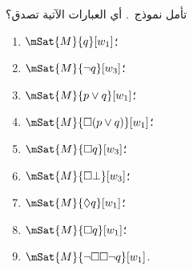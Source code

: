 \documentclass[../../../include/open-logic-section]{subfiles}
\begin{document}
\begin{prob}
  تأمل نموذج~. أي العبارات الآتية
  تصدق؟
    \begin{enumerate}
    \item $\mSat{M}{q}[w_1]$؛
    \item $\mSat{M}{\lnot q}[w_3]$؛
    \item $\mSat{M}{p \lor q}[w_1]$؛
    \item $\mSat{M}{\Box (p \lor q)}[w_1]$؛
    \item $\mSat{M}{\Box q}[w_3]$؛
    \item $\mSat{M}{\Box \bot}[w_3]$؛
    \item $\mSat{M}{\Diamond q}[w_1]$؛
    \item $\mSat{M}{\Box q}[w_1]$؛
    \item $\mSat{M}{\lnot \Box\Box \lnot q}[w_1]$.
    \end{enumerate}
\end{prob}
\end{document}

